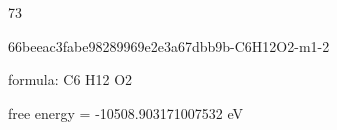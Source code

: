 \documentclass{article}
\begin{document}
73

\vspace{1cm}


66beeac3fabe98289969e2e3a67dbb9b-C6H12O2-m1-2



formula: C6 H12 O2



free energy = -10508.903171007532 eV
\end{document}
